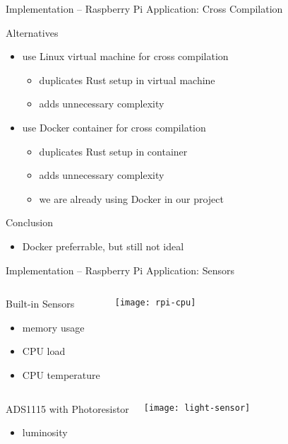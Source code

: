 \begin{frame}{Implementation -- Raspberry Pi Application: Cross Compilation}
  \begin{block}{Alternatives}
    \begin{itemize}
      \item use Linux virtual machine for cross compilation
      \begin{itemize}
        \item {} duplicates Rust setup in virtual machine
        \item {} adds unnecessary complexity
      \end{itemize}
      \item use Docker container for cross compilation
      \begin{itemize}
        \item {} duplicates Rust setup in container
        \item {} adds unnecessary complexity
        \item {} we are already using Docker in our project
      \end{itemize}
    \end{itemize}
  \end{block}

  \begin{block}{Conclusion}
    \begin{itemize}
      \item Docker preferrable, but still not ideal
    \end{itemize}
  \end{block}
\end{frame}

\begin{frame}{Implementation -- Raspberry Pi Application: Sensors}
  \begin{columns}
    \begin{block}{Built-in Sensors}
      \begin{itemize}
        \item memory usage
        \item CPU load
        \item CPU temperature
      \end{itemize}
    \end{block}

    \vfill
    \centering
    \texttt{[image: rpi-cpu]}
  \end{columns}

  \begin{columns}
    \begin{block}{ADS1115 with Photoresistor}
      \begin{itemize}
          \item luminosity
      \end{itemize}
    \end{block}

    \vfill
    \centering
    \texttt{[image: light-sensor]}
  \end{columns}
\end{frame}

